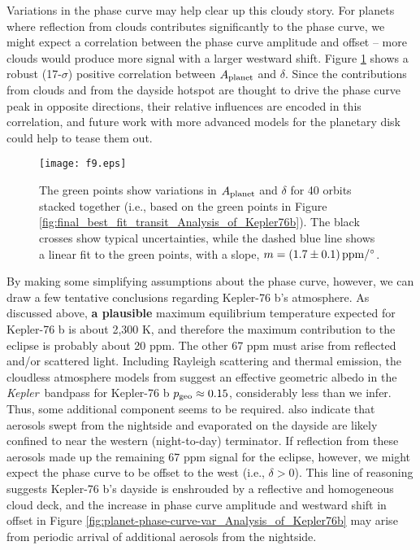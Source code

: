 \documentclass[manuscript]{aastex62}
\newcommand{\kepler}{{\it Kepler}}
\begin{document}
Variations in the phase curve may help clear up this cloudy story. For planets where reflection from clouds contributes significantly to the phase curve, we might expect a correlation between the phase curve amplitude and offset -- more clouds would produce more signal with a larger westward shift. Figure \ref{fig:Aplanet-delta-var_Analysis_of_Kepler76b} shows a robust (17-$\sigma$) positive correlation between $A_{\rm planet}$ and $\delta$. Since the contributions from clouds and from the dayside hotspot are thought to drive the phase curve peak in opposite directions, their relative influences are encoded in this correlation, and future work with more advanced models for the planetary disk \citep[e.g.,][]{2017ascl.soft11019L} could help to tease them out.

\begin{figure}
\texttt{[image: f9.eps]}
\caption{The green points show variations in $A_{\rm planet}$ and $\delta$ for 40 orbits stacked together (i.e., based on the green points in Figure \ref{fig:final_best_fit_transit_Analysis_of_Kepler76b}). The black crosses show typical uncertainties, while the dashed blue line shows a linear fit to the green points, with a slope, $m = \left( 1.7 \pm 0.1 \right) {\rm ppm/^\circ}$. \label{fig:Aplanet-delta-var_Analysis_of_Kepler76b}}
\end{figure}

By making some simplifying assumptions about the phase curve, however, we can draw a few tentative conclusions regarding Kepler-76 b's atmosphere. As discussed above, \textbf{a plausible} maximum equilibrium temperature expected for Kepler-76 b is about 2,300 K, and therefore the maximum contribution to the eclipse is probably about 20 ppm. The other 67 ppm must arise from reflected and/or scattered light. Including Rayleigh scattering and thermal emission, the cloudless atmosphere models from \citet{2016ApJ...828...22P} suggest an effective geometric albedo in the \kepler\ bandpass for Kepler-76 b $p_{\rm geo} \approx 0.15$, considerably less than we infer. Thus, some additional component seems to be required. \citet{2016ApJ...828...22P} also indicate that aerosols swept from the nightside and evaporated on the dayside are likely confined to near the western (night-to-day) terminator. If reflection from these aerosols made up the remaining 67 ppm signal for the eclipse, however, we might expect the phase curve to be offset to the west (i.e., $\delta > 0$). This line of reasoning suggests Kepler-76 b's dayside is enshrouded by a reflective and homogeneous cloud deck, and the increase in phase curve amplitude and westward shift in offset in Figure \ref{fig:planet-phase-curve-var_Analysis_of_Kepler76b} may arise from periodic arrival of additional aerosols from the nightside.
\end{document}
